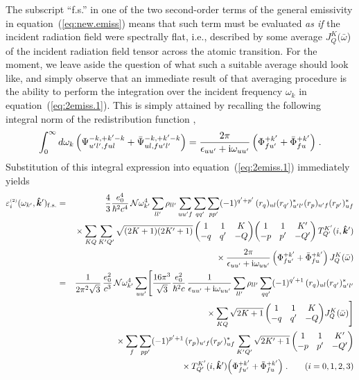 \documentclass[preprint]{aastex}
\newcommand{\<}{{\kern-5pt}}
\newcommand{\thrj}[6]{\biggl(
	\begin{matrix}
	#1&#2&#3\\
	#4&#5&#6\\
	\end{matrix}\biggr)}
\newcommand{\apx}[1]{^{\mbox{\tiny{(#1)}}}}
\begin{document}
%

The subscript ``f.s.'' in one of the two second-order terms of the 
general emissivity in equation~(\ref{eq:new.emiss}) means that such term must 
be evaluated \emph{as if} the incident radiation field were spectrally flat,
i.e., described by some average $J^K_Q(\bar\omega$) of the incident radiation 
field tensor across the atomic transition. 
%
For the moment, we leave aside the question of what such a suitable average 
should look like, and simply observe that an immediate result of that 
averaging procedure is the ability to perform the integration over the incident 
frequency $\omega_k$ in equation~(\ref{eq:2emiss.1}).
%
This is simply attained by recalling the following integral norm of the
redistribution function \cite[cf.][equation (15)]{Ca14},
%
\begin{equation} \label{eq:integral2}
\int_{0}^\infty d\omega_{k}\,
	\Bigl(
	\Psi_{u'l',ful}^{-k,+k'-k} + 
	\bar\Psi_{ul,fu'l'}^{-k,+k'-k}
	\Bigr)
=\frac{2\pi}{\epsilon_{uu'}+{\rm i}\omega_{uu'}}\,
	\Bigl(
	\Phi_{fu'}^{+k'} + \bar\Phi_{fu}^{+k'}
	\Bigr)\;.
\end{equation}
%
Substitution of this integral expression into
equation~(\ref{eq:2emiss.1}) immediately yields
%
\begin{eqnarray} \label{eq:coherent.flat}
\varepsilon\apx{2}_i(\omega_{k'},\bm{\hat k}')_{\rm f.s.}
&=&
	\frac{4}{3}\frac{e_0^4}{\hbar^2 c^4}\,{\cal N}\omega_{k'}^4
	\sum_{ll'}\rho_{ll'}\sum_{uu'f}
	\sum_{qq'}\sum_{pp'}(-1)^{q'+p'}\,
	(r_q)_{ul}(r_{q'})^\ast_{u'l'}
	(r_p)_{u'f}(r_{p'})^\ast_{uf} \nonumber \\
&&{}\times
	\sum_{KQ}\sum_{K'Q'}\sqrt{(2K+1)(2K'+1)}\,
	\thrj{1}{1}{K}{-q}{q'}{-Q}
	\thrj{1}{1}{K'}{-p}{p'}{-Q'}\,
	T^{K'}_{Q'}(i,\bm{\hat k}') \nonumber \\
&&\kern 2cm{}\times
	\frac{2\pi}{\epsilon_{uu'}+{\rm i}\omega_{uu'}}\,
	\Bigl(
	\Phi_{fu'}^{+k'} + \bar\Phi_{fu}^{+k'}
	\Bigr)\,
	J^K_Q(\bar\omega) \nonumber \\
&=& 
	\frac{1}{2\pi^2\sqrt3}\,\frac{e_0^2}{c^3}\,
	{\cal N}\omega_{k'}^4
	\sum_{uu'} \Biggl[
	\frac{16\pi^3}{\sqrt3}\frac{e_0^2}{\hbar^2 c}\,
	\frac{1}{\epsilon_{uu'}+{\rm i}\omega_{uu'}}
	\sum_{ll'}\rho_{ll'}
	\sum_{qq'}(-1)^{q'+1}\,
	(r_q)_{ul}(r_{q'})^\ast_{u'l'} \nonumber \\
&&\kern 3.5cm{}\times
	\sum_{KQ}\sqrt{2K+1}\,
	\thrj{1}{1}{K}{-q}{q'}{-Q}
	J^K_Q(\bar\omega)
	\Biggr] \nonumber \\
\noalign{\allowbreak}
&&{}\times
	\sum_{f}\sum_{pp'}(-1)^{p'+1}\,
	(r_p)_{u'f}(r_{p'})^\ast_{uf}
	\sum_{K'Q'}\sqrt{2K'+1}\,
	\thrj{1}{1}{K'}{-p}{p'}{-Q'} \nonumber \\
&&\kern 3.5cm{}\times
	T^{K'}_{Q'}(i,\bm{\hat k}')
	\Bigl(
	\Phi_{fu'}^{+k'} + \bar\Phi_{fu}^{+k'}
	\Bigr)\;.\qquad (i=0,1,2,3)
\end{eqnarray}
%
\end{document}

